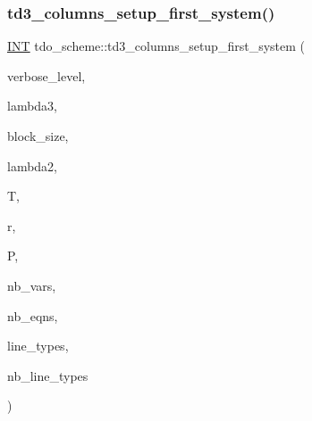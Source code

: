 \subsubsection{\texorpdfstring{td3\+\_\+columns\+\_\+setup\+\_\+first\+\_\+system()}{td3\_columns\_setup\_first\_system()}}
{\footnotesize\ttfamily \mbox{\hyperlink{galois_8h_a09fddde158a3a20bd2dcadb609de11dc}{I\+NT}} tdo\+\_\+scheme\+::td3\+\_\+columns\+\_\+setup\+\_\+first\+\_\+system (\begin{DoxyParamCaption}\item[{\mbox{\hyperlink{galois_8h_a09fddde158a3a20bd2dcadb609de11dc}{I\+NT}}}]{verbose\+\_\+level,  }\item[{\mbox{\hyperlink{galois_8h_a09fddde158a3a20bd2dcadb609de11dc}{I\+NT}}}]{lambda3,  }\item[{\mbox{\hyperlink{galois_8h_a09fddde158a3a20bd2dcadb609de11dc}{I\+NT}}}]{block\+\_\+size,  }\item[{\mbox{\hyperlink{galois_8h_a09fddde158a3a20bd2dcadb609de11dc}{I\+NT}}}]{lambda2,  }\item[{\mbox{\hyperlink{classtdo__data}{tdo\+\_\+data}} \&}]{T,  }\item[{\mbox{\hyperlink{galois_8h_a09fddde158a3a20bd2dcadb609de11dc}{I\+NT}}}]{r,  }\item[{\mbox{\hyperlink{classpartitionstack}{partitionstack}} \&}]{P,  }\item[{\mbox{\hyperlink{galois_8h_a09fddde158a3a20bd2dcadb609de11dc}{I\+NT}} \&}]{nb\+\_\+vars,  }\item[{\mbox{\hyperlink{galois_8h_a09fddde158a3a20bd2dcadb609de11dc}{I\+NT}} \&}]{nb\+\_\+eqns,  }\item[{\mbox{\hyperlink{galois_8h_a09fddde158a3a20bd2dcadb609de11dc}{I\+NT}} $\ast$\&}]{line\+\_\+types,  }\item[{\mbox{\hyperlink{galois_8h_a09fddde158a3a20bd2dcadb609de11dc}{I\+NT}} \&}]{nb\+\_\+line\+\_\+types }\end{DoxyParamCaption})}

\mbox{\label{classtdo__scheme_a21664530cbf05cf829360e9842a0f509}} 
